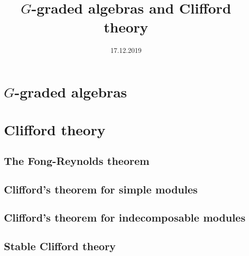 \documentclass[fontsize=11pt,fleqn,a4paper]{scrartcl}
\title{$G$-graded algebras and Clifford theory}
\date{17.12.2019}
\begin{document}
\maketitle

\section{$G$-graded algebras}


\section{Clifford theory}

\subsection{The Fong-Reynolds theorem}

\subsection{Clifford's theorem for simple modules}

\subsection{Clifford's theorem for indecomposable modules}

\subsection{Stable Clifford theory}

\end{document}
